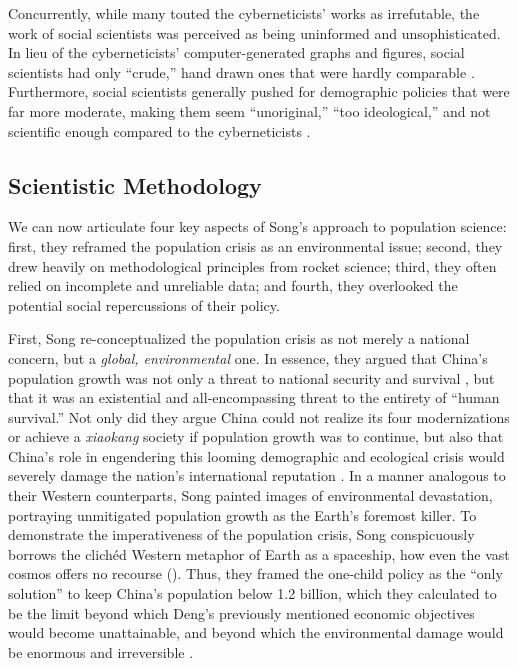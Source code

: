 \documentclass[12pt, a4paper, twoside]{article}
\begin{document}
Concurrently, while many touted the cyberneticists’ works as irrefutable, the work of social scientists was perceived as being uninformed and unsophisticated. In lieu of the cyberneticists’ computer-generated graphs and figures, social scientists had only “crude,” hand drawn ones that were hardly comparable \autocite[p.\ 209]{Greenhalgh2008JustOneChild}. Furthermore, social scientists generally pushed for demographic policies that were far more moderate, making them seem “unoriginal,” “too ideological,” and not scientific enough compared to the cyberneticists \autocite[p.\ 260]{Greenhalgh2008JustOneChild}. 

\subsection{Scientistic Methodology}

We can now articulate four key aspects of Song's approach to population science: first, they reframed the population crisis as an environmental issue; second, they drew heavily on methodological principles from rocket science; third, they often relied on incomplete and unreliable data; and fourth, they overlooked the potential social repercussions of their policy.

First, Song re-conceptualized the population crisis as not merely a national concern, but a \emph{global, environmental} one. In essence, they argued that China’s population growth was not only a threat to national security and survival \autocite[p.\ 153]{Greenhalgh2008JustOneChild}, but that it was an existential and all-encompassing threat to the entirety of “human survival.” Not only did they argue China could not realize its four modernizations or achieve a \emph{xiaokang} society if population growth was to continue, but also that China’s role in engendering this looming demographic and ecological crisis would severely damage the nation’s international reputation \autocite[p.\ 154]{Greenhalgh2008JustOneChild}. In a manner analogous to their Western counterparts, Song painted images of environmental devastation, portraying unmitigated population growth as the Earth's foremost killer. To demonstrate the imperativeness of the population crisis, Song conspicuously borrows the clichéd Western metaphor of Earth as a spaceship, how even the vast cosmos offers no recourse (\cites[p.\ 149]{Greenhalgh2008JustOneChild}[p.\ 21]{Ehrlich1971PopulationBomb}). Thus, they framed the one-child policy as the “only solution” to keep China’s population below 1.2 billion, which they calculated to be the limit beyond which Deng’s previously mentioned economic objectives would become unattainable, and beyond which the environmental damage would be enormous and irreversible \autocite[pp.\ 158, 240]{Greenhalgh2008JustOneChild}.
\end{document}
